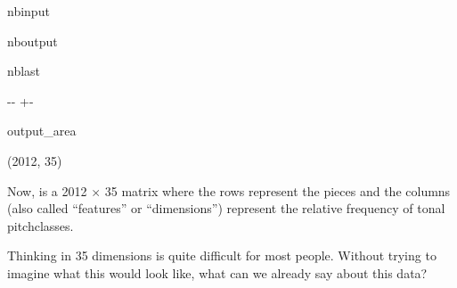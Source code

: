 \documentclass[letterpaper,10pt,english]{sphinxmanual}
\newlength\nbsphinxcodecellspacing
\begin{document}
\begin{sphinxuseclass}{nbinput}
{
\begin{sphinxVerbatim}[commandchars=\\\{\}]
\llap{\color{nbsphinxin}[14]:\,\hspace{\fboxrule}\hspace{\fboxsep}}
  

 
\end{sphinxVerbatim}
}

\end{sphinxuseclass}
\begin{sphinxuseclass}{nboutput}
\begin{sphinxuseclass}{nblast}
{

\kern-\sphinxverbatimsmallskipamount\kern-\baselineskip
\kern+\FrameHeightAdjust\kern-\fboxrule
\vspace{\nbsphinxcodecellspacing}

\begin{sphinxuseclass}{output_area}
\begin{sphinxuseclass}{}


\begin{sphinxVerbatim}[commandchars=\\\{\}]
\llap{\color{nbsphinxout}[14]:\,\hspace{\fboxrule}\hspace{\fboxsep}}(2012, 35)
\end{sphinxVerbatim}



\end{sphinxuseclass}
\end{sphinxuseclass}
}

\end{sphinxuseclass}
\end{sphinxuseclass}
\sphinxAtStartPar
Now,  is a 2012 \(\times\) 35 matrix where the rows represent the pieces and the columns (also called “features” or “dimensions”) represent the relative frequency of tonal pitch\sphinxhyphen{}classes.

\sphinxAtStartPar
Thinking in 35 dimensions is quite difficult for most people. Without trying to imagine what this would look like, what can we already say about this data?
\end{document}
